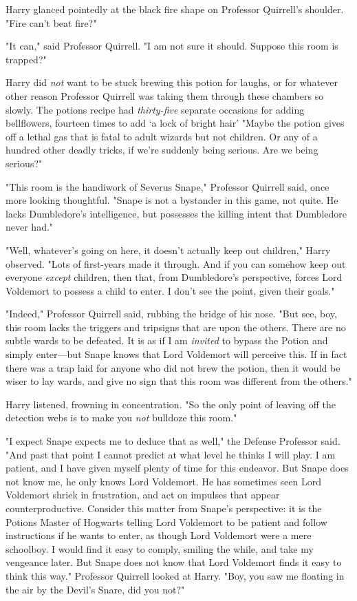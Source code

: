 Harry glanced pointedly at the black fire shape on Professor Quirrell's
shoulder. "Fire can't beat fire?"

"It can," said Professor Quirrell. "I am not sure it should. Suppose this room
is trapped?"

Harry did \emph{not} want to be stuck brewing this potion for laughs, or for
whatever other reason Professor Quirrell was taking them through these chambers
so slowly. The potions recipe had \emph{thirty-five} separate occasions for
adding bellflowers, fourteen times to add `a lock of bright hair'{\el}
"Maybe the potion gives off a lethal gas that is fatal to adult wizards but not
children. Or any of a hundred other deadly tricks, if we're suddenly being
serious. Are we being serious?"

"This room is the handiwork of Severus Snape," Professor Quirrell said, once
more looking thoughtful. "Snape is not a bystander in this game, not quite. He
lacks Dumbledore's intelligence, but possesses the killing intent that
Dumbledore never had."

"Well, whatever's going on here, it doesn't actually keep out children," Harry
observed. "Lots of first-years made it through. And if you can somehow keep out
everyone \emph{except} children, then that, from Dumbledore's perspective,
forces Lord Voldemort to possess a child to enter. I don't see the point, given
their goals."

"Indeed," Professor Quirrell said, rubbing the bridge of his nose. "But see,
boy, this room lacks the triggers and tripsigns that are upon the others. There
are no subtle wards to be defeated. It is as if I am \emph{invited} to bypass
the Potion and simply enter---but Snape knows that Lord Voldemort will perceive
this. If in fact there was a trap laid for anyone who did not brew the potion,
then it would be wiser to lay wards, and give no sign that this room was
different from the others."

Harry listened, frowning in concentration. "So{\el} the only point of
leaving off the detection webs is to make you \emph{not} bulldoze this room."

"I expect Snape expects me to deduce that as well," the Defense Professor said.
"And past that point I cannot predict at what level he thinks I will play. I am
patient, and I have given myself plenty of time for this endeavor. But Snape
does not know me, he only knows Lord Voldemort. He has sometimes seen Lord
Voldemort shriek in frustration, and act on impulses that appear
counterproductive. Consider this matter from Snape's perspective: it is the
Potions Master of Hogwarts telling Lord Voldemort to be patient and follow
instructions if he wants to enter, as though Lord Voldemort were a mere
schoolboy. I would find it easy to comply, smiling the while, and take my
vengeance later. But Snape does not know that Lord Voldemort finds it easy to
think this way." Professor Quirrell looked at Harry. "Boy, you saw me floating
in the air by the Devil's Snare, did you not?"

